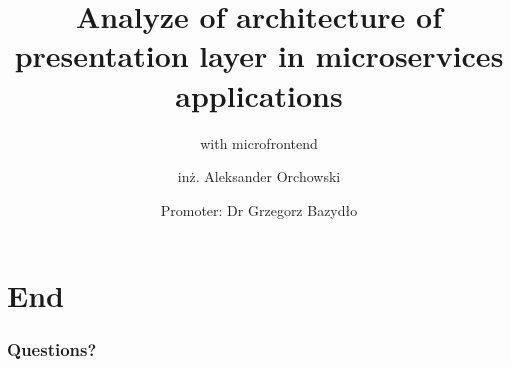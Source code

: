 \documentclass[usenames,dvipsnames]{beamer}
\title{Analyze of architecture of presentation layer in microservices applications}
\subtitle{with microfrontend}
\author{inż. Aleksander Orchowski}
\institute{University of Zielona Góra}
\date{Promoter: Dr Grzegorz Bazydło}
\begin{document}









\section{End}
\begin{frame}[t]
\frametitle{Questions?}
\end{frame}
%
%
%
%
\end{document}

